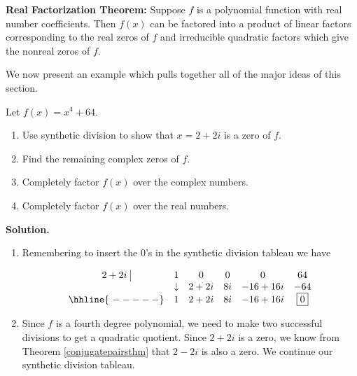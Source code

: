 \documentclass{ximera}
\begin{document}
\smallskip

\colorbox{ResultColor}{\bbm
\begin{thm}\label{realfactorization}\textbf{Real Factorization Theorem:} Suppose $f$ is a polynomial function with real number coefficients.  Then $f(x)$ can be factored into a product of linear factors corresponding to the real zeros of $f$ and irreducible quadratic factors which give the nonreal zeros of $f$. 
\end{thm}
\ebm}

\smallskip

We now present an example which pulls together all of the major ideas of this section.

\begin{ex}  Let $f(x) = x^4+64$.  

\begin{enumerate}

\item  Use synthetic division to show that $x=2+2i$ is a zero of $f$.

\item  Find the remaining complex zeros of $f$.

\item  Completely factor $f(x)$ over the complex numbers.

\item  Completely factor $f(x)$ over the real numbers.

\end{enumerate}

{ \bf Solution.}

\begin{enumerate}

\item  Remembering to insert the $0$'s in the synthetic division tableau we have

\[ \begin{array}{cccccc}
 2+2i \, \, \vline& 1 & 0 & 0  & 0 & 64 \\

  & \downarrow     &  2+2i  &  8i & -16+16i & -64\\ \hhline{~-----} 
  
               & 1 &  2+2i  & 8i & -16+16i &  \fbox{$0$}  \\ \end{array}\]



\item  Since $f$ is a fourth degree polynomial, we need to make two successful divisions to get a quadratic quotient.  Since $2+2i$ is a zero, we know from Theorem \ref{conjugatepairsthm} that $2-2i$ is also a zero.  We continue our synthetic division tableau.


\end{enumerate}
\end{ex}
\end{document}
